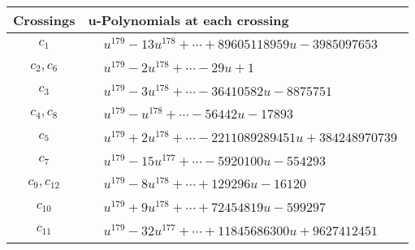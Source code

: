 \documentclass[1p]{elsarticle_modified}
\theoremstyle{definition}
\begin{document}
\begin{tabular}{m{50pt}|m{274pt}}
Crossings & \hspace{64pt}u-Polynomials at each crossing \\
\hline $$\begin{aligned}c_{1}\end{aligned}$$&$\begin{aligned}
&u^{179}-13 u^{178}+\cdots+89605118959 u-3985097653
\end{aligned}$\\
\hline $$\begin{aligned}c_{2},c_{6}\end{aligned}$$&$\begin{aligned}
&u^{179}-2 u^{178}+\cdots-29 u+1
\end{aligned}$\\
\hline $$\begin{aligned}c_{3}\end{aligned}$$&$\begin{aligned}
&u^{179}-3 u^{178}+\cdots-36410582 u-8875751
\end{aligned}$\\
\hline $$\begin{aligned}c_{4},c_{8}\end{aligned}$$&$\begin{aligned}
&u^{179}- u^{178}+\cdots-56442 u-17893
\end{aligned}$\\
\hline $$\begin{aligned}c_{5}\end{aligned}$$&$\begin{aligned}
&u^{179}+2 u^{178}+\cdots-2211089289451 u+384248970739
\end{aligned}$\\
\hline $$\begin{aligned}c_{7}\end{aligned}$$&$\begin{aligned}
&u^{179}-15 u^{177}+\cdots-5920100 u-554293
\end{aligned}$\\
\hline $$\begin{aligned}c_{9},c_{12}\end{aligned}$$&$\begin{aligned}
&u^{179}-8 u^{178}+\cdots+129296 u-16120
\end{aligned}$\\
\hline $$\begin{aligned}c_{10}\end{aligned}$$&$\begin{aligned}
&u^{179}+9 u^{178}+\cdots+72454819 u-599297
\end{aligned}$\\
\hline $$\begin{aligned}c_{11}\end{aligned}$$&$\begin{aligned}
&u^{179}-32 u^{177}+\cdots+11845686300 u+9627412451
\end{aligned}$\\
\hline
\end{tabular}\\~\\
\end{document}
